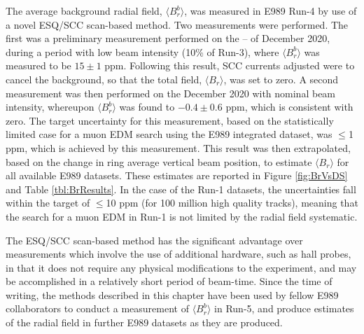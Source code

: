 The average background radial field, $\langle B_{r}^{b} \rangle$, was measured in E989 Run-4 by use of a novel ESQ/SCC scan-based method. Two measurements were performed. The first was a preliminary measurement performed on the -- of December 2020, during a period with low beam intensity (10\% of Run-3), where $\langle B_{r}^{b} \rangle$ was measured to be $15\pm1$ ppm. Following this result, SCC currents adjusted were to cancel the background, so that the total field, $\langle B_{r} \rangle$, was set to zero. A second measurement was then performed on the  December 2020 with nominal beam intensity, whereupon $\langle B_{r}^{b} \rangle$ was found to $-0.4\pm0.6$ ppm, which is consistent with zero. The target uncertainty for this measurement, based on the statistically limited case for a muon EDM search using the E989 integrated dataset, was $\leq$1 ppm, which is achieved by this measurement. This result was then extrapolated, based on the change in ring average vertical beam position, to estimate $\langle B_{r} \rangle$ for all available E989 datasets. These estimates are reported in Figure \ref{fig:BrVsDS} and Table \ref{tbl:BrResults}. In the case of the Run-1 datasets, the uncertainties fall within the target of $\leq$10 ppm (for 100 million high quality tracks), meaning that the search for a muon EDM in Run-1 is not limited by the radial field systematic.

The ESQ/SCC scan-based method has the significant advantage over measurements which involve the use of additional hardware, such as hall probes, in that it does not require any physical modifications to the experiment, and may be accomplished in a relatively short period of beam-time. Since the time of writing, the methods described in this chapter have been used by fellow E989 collaborators to conduct a measurement of $\langle B_{r}^{b} \rangle$ in Run-5, and produce estimates of the radial field in further E989 datasets as they are produced.